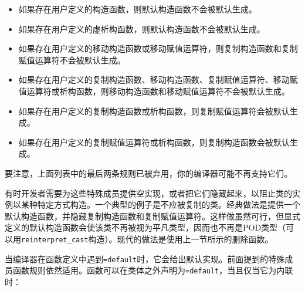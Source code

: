 \begin{itemize}
\item 如果存在用户定义的构造函数，则默认构造函数不会被默认生成。



\item 如果存在用户定义的虚析构函数，则默认构造函数不会被默认生成。



\item 如果存在用户定义的移动构造函数或移动赋值运算符，则复制构造函数和复制赋值运算符不会被默认生成。



\item 如果存在用户定义的复制构造函数、移动构造函数、复制赋值运算符、移动赋值运算符或析构函数，则移动构造函数和移动赋值运算符不会被默认生成。



\item 如果存在用户定义的复制构造函数或析构函数，则复制赋值运算符会被默认生成。



\item 如果存在用户定义的复制赋值运算符或析构函数，则复制构造函数会被默认生成。

\end{itemize}



\begin{myNote}
要注意，上面列表中的最后两条规则已被弃用，你的编译器可能不再支持它们。
\end{myNote}



有时开发者需要为这些特殊成员提供空实现，或者把它们隐藏起来，以阻止类的实例以某种特定方式构造。一个典型的例子是不应被复制的类。经典做法是提供一个默认构造函数，并隐藏复制构造函数和复制赋值运算符。这样做虽然可行，但显式定义的默认构造函数会使该类不再被视为平凡类型，因而也不再是POD类型（可以用\texttt{reinterpret\_\allowbreak{}cast}构造）。现代的做法是使用上一节所示的删除函数。



当编译器在函数定义中遇到\texttt{=default}时，它会给出默认实现。前面提到的特殊成员函数规则依然适用。函数可以在类体之外声明为\texttt{=default}，当且仅当它为内联时：




